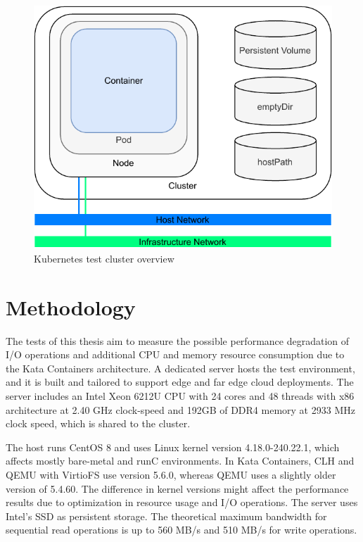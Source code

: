 \begin{figure}[ht]
  \begin{center}
    \includegraphics[width=12cm]{images/TestArchitectureClusterSimple.pdf}
    \caption{Kubernetes test cluster overview}
    \label{fig:TestArchitectureCluster}
  \end{center}
\end{figure}

\section{Methodology}

The tests of this thesis aim to measure the possible performance degradation of I/O operations and additional CPU and memory resource consumption due to the Kata Containers architecture. A dedicated server
hosts the test environment, and it is built and tailored to support edge and far edge cloud deployments. The server includes an Intel Xeon 6212U CPU with 24 cores and 48 threads with x86 architecture at 2.40 GHz clock-speed and 192GB of DDR4 memory at 2933 MHz clock speed, which is shared to the cluster.

The host runs CentOS 8 and uses Linux kernel version 4.18.0-240.22.1, which affects mostly bare-metal and runC environments. In Kata Containers, CLH and QEMU with VirtioFS use version 5.6.0, whereas QEMU uses a slightly older version of 5.4.60. The difference in kernel versions might affect the performance results due to optimization in resource usage and I/O operations. The server uses Intel's SSD \cite{IntelSSD} as persistent storage. The theoretical maximum bandwidth for sequential read operations is up to 560 MB/s and 510 MB/s for write operations.

